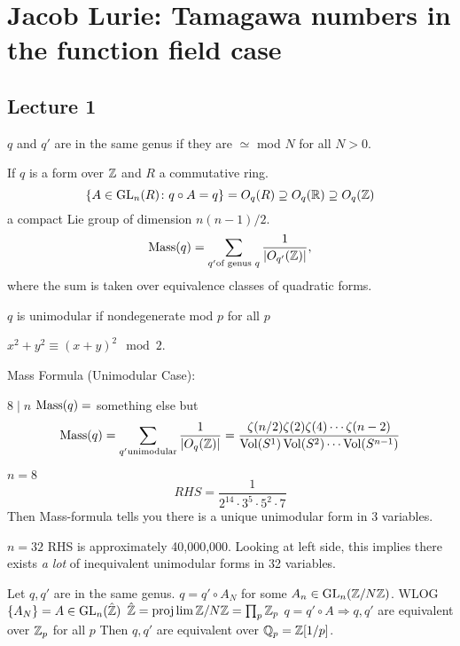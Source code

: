 \newpage
\section{Jacob Lurie: Tamagawa numbers in the function field case}
\subsection{Lecture 1}



\begin{dfn}
$q$ and $q'$ are in the same genus if they are $\simeq$ mod $N$ for all $N>0$.
\end{dfn}

If $q$ is a form over $\mathbb{Z}$ and $R$ a commutative ring.
	\[
	\{ A \in \operatorname{GL}_n(R) \colon q \circ A=q \}= O_q(R) \supseteq O_q(\mathbb{R}) \supseteq O_q(\mathbb{Z})
	\]
a compact Lie group of dimension $n(n-1)/2$. 
	\[
	\operatorname{Mass}(q)= \sum_{q' \text{of genus }q} \dfrac{1}{|O_{q'}(\mathbb{Z})|},
	\]
where the sum is taken over equivalence classes of quadratic forms.


\begin{dfn}[Unimodular]
$q$ is unimodular if nondegenerate mod $p$ for all $p$
\end{dfn}

$x^2+y^2 \equiv (x+y)^2 \mod 2$.

Mass Formula (Unimodular Case):

$8 \mid n$
$\operatorname{Mass}(q)=$ something else but
	\[
	\operatorname{Mass}(q)= \sum_{q' \text{unimodular}} \dfrac{1}{|O_q(\mathbb{Z})|}= \dfrac{\zeta(n/2)\zeta(2)\zeta(4)\cdots\zeta(n-2)}{\operatorname{Vol}(S^1)\operatorname{Vol}(S^2)\cdots\operatorname{Vol}(S^{n-1})}
	\]


\begin{ex}
$n=8$ 
	\[
	RHS= \dfrac{1}{2^{14}\cdot3^5\cdot5^2\cdot7}
	\]
Then Mass-formula tells you there is a unique unimodular form in 3 variables.
\end{ex}


\begin{ex}
$n=32$
RHS is approximately 40,000,000. Looking at left side, this implies there exists \emph{a lot} of inequivalent unimodular forms in 32 variables. 
\end{ex}


Let $q,q'$ are in the same genus. 
$q= q' \circ A_N$ for some $A_n \in \operatorname{GL}_n(\mathbb{Z}/N\mathbb{Z})$.
WLOG $\{A_N\}= A \in \operatorname{GL}_n(\hat{\mathbb{Z}})$
$\hat{\mathbb{Z}}= \projlim \mathbb{Z}/N\mathbb{Z}= \prod_p \mathbb{Z}_p$
$q= q' \circ A \Rightarrow q,q'$ are equivalent over $\mathbb{Z}_p$ for all $p$
Then $q,q'$ are equivalent over $\mathbb{Q}_p= \mathbb{Z}[1/p]$.


